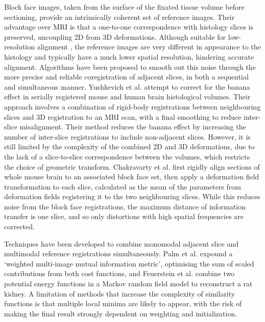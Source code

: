   Block face images, taken from the surface of the fixated tissue volume before sectioning, provide an intrinsically coherent set of reference images. Their advantage over MRI is that a one-to-one correspondence with histology slices is preserved, uncoupling 2D from 3D deformations. Although suitable for low-resolution alignment  \cite{Palm2010}, the reference images are very different in appearance to the histology and typically have a much lower spatial resolution, hindering accurate alignment. Algorithms have been proposed to smooth out this noise through the more precise and reliable coregistration of adjacent slices, in both a sequential \cite{Yushkevich2006,Chakravarty2008} and simultaneous \cite{Feuerstein2011} manner. Yushkevich et al. attempt to correct for the banana effect in serially registered mouse \cite{Yushkevich2006} and human \cite{Adler2012} brain histological volumes. Their approach involves a combination of rigid-body registrations between neighbouring slices and 3D registration to an MRI scan, with a final smoothing to reduce inter-slice misalignment. Their method reduces the banana effect by increasing the number of inter-slice registrations to include non-adjacent slices. However, it is still limited by the complexity of the combined 2D and 3D deformations, due to the lack of a slice-to-slice correspondence between the volumes, which restricts the choice of geometric transform. Chakravarty et al. \cite{Chakravarty2008} first rigidly align sections of whole mouse brain to an associated block face set, then apply a deformation field transformation to each slice, calculated as the mean of the parameters from deformation fields registering it to the two neighbouring slices. While this reduces noise from the block face registrations, the maximum distance of information transfer is one slice, and so only distortions with high spatial frequencies are corrected.
  
  Techniques have been developed to combine monomodal adjacent slice and multimodal reference registrations simultaneously. Palm et al. \cite{Palm2008} expound a `weighted multi-image mutual information metric', optimising the sum of scaled contributions from both cost functions, and Feuerstein et al. \cite{Feuerstein2011} combine two potential energy functions in a Markov random field model to reconstruct a rat kidney. A limitation of methods that increase the complexity of similarity functions is that multiple local minima are likely to appear, with the risk of making the final result strongly dependent on weighting and initialization.
  
